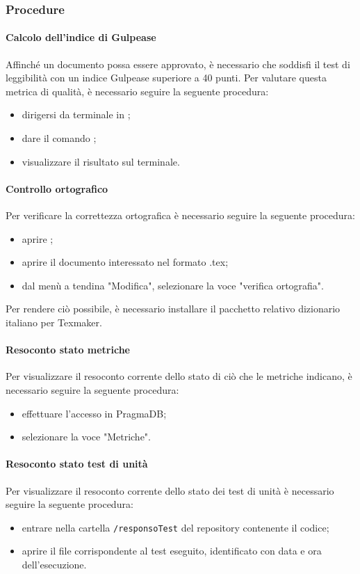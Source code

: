 \subsubsection{Procedure}
\paragraph{Calcolo dell'indice di Gulpease}
Affinché un documento possa essere approvato, è necessario che soddisfi il test di leggibilità con un indice Gulpease superiore a 40 punti. Per valutare questa metrica di qualità, è necessario seguire la seguente procedura:
\begin{itemize}
	\item dirigersi da terminale in \GulScript{};
	\item dare il comando ;
	\item visualizzare il risultato sul terminale.
\end{itemize}
\paragraph{Controllo ortografico}
Per verificare la correttezza ortografica è necessario seguire la seguente procedura:
\begin{itemize}
	\item aprire ;
	\item aprire il documento interessato nel formato .tex;
	\item dal menù a tendina "Modifica", selezionare la voce "verifica ortografia".
\end{itemize}
Per rendere ciò possibile, è necessario installare il pacchetto relativo dizionario italiano per Texmaker.
\paragraph{Resoconto stato metriche}\label{res_metriche}
Per visualizzare il resoconto corrente dello stato di ciò che le metriche indicano, è necessario seguire la seguente procedura:
\begin{itemize}
	\item effettuare l'accesso in PragmaDB;
	\item selezionare la voce "Metriche".
\end{itemize}
\paragraph{Resoconto stato test di unità}
Per visualizzare il resoconto corrente dello stato dei test di unità è necessario seguire la seguente procedura:
\begin{itemize}
	\item entrare nella cartella \texttt{/responsoTest} del repository contenente il codice;
	\item aprire il file corrispondente al test eseguito, identificato con data e ora dell'esecuzione.
\end{itemize}
